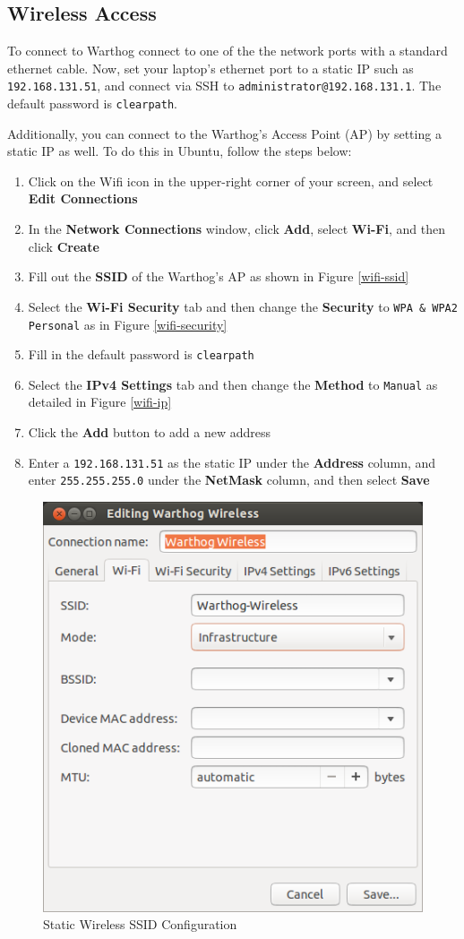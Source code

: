 \documentclass[]{clearpath-latex/clearpath-manual}
\begin{document}
\subsection{Wireless Access}

To connect to Warthog connect to one of the the network ports with a standard ethernet cable. Now, set your laptop’s ethernet port to a static IP such as \lstinline{192.168.131.51}, and connect via SSH to \lstinline{administrator@192.168.131.1}. The default password is \lstinline{clearpath}.

Additionally, you can connect to the Warthog's Access Point (AP) by setting a static IP as well. To do this in Ubuntu, follow the steps below:
\begin{enumerate}
  \item Click on the Wifi icon in the upper-right corner of your screen, and select \textbf{Edit Connections}
  \item In the \textbf{Network Connections} window, click \textbf{Add}, select \textbf{Wi-Fi},  and then click \textbf{Create}
  \item Fill out the \textbf{SSID} of the Warthog's AP as shown in Figure \autoref{wifi-ssid}
  \item Select the \textbf{Wi-Fi Security} tab and then change the \textbf{Security} to \lstinline{WPA & WPA2 Personal} as in Figure \autoref{wifi-security}
  \item Fill in the default password is \lstinline{clearpath}
  \item Select the \textbf{IPv4 Settings} tab and then change the \textbf{Method} to \lstinline{Manual} as detailed in Figure \autoref{wifi-ip}
  \item Click the \textbf{Add} button to add a new address
  \item Enter a \lstinline{192.168.131.51} as the static IP under the \textbf{Address} column, and enter \lstinline{255.255.255.0} under the \textbf{NetMask} column, and then select \textbf{Save}
\end{enumerate}

\begin{figure}[H]
  \centering
  \includegraphics[width=0.5\linewidth]{wifi-ssid.png}
  \caption{Static Wireless SSID Configuration}
  \label{wifi-ssid}
\end{figure}
\end{document}
